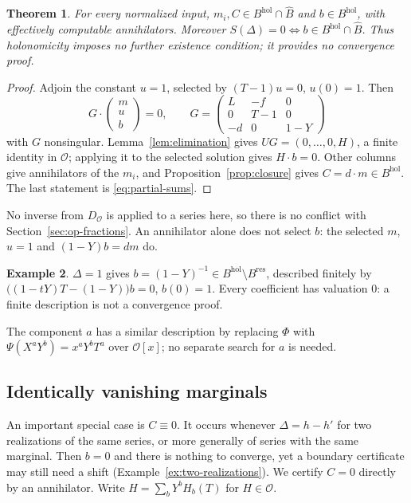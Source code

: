 \documentclass[11pt,a4paper]{article}
\newcommand{\Op}{\mathcal O}
\newcommand{\Bhat}{\widehat B}
\newcommand{\Bres}{B^{\mathrm{res}}}
\newcommand{\Bhol}{B^{\mathrm{hol}}}
\newcommand{\Dop}{D_{\Op}}
\theoremstyle{plain}
\newtheorem{theorem}{Theorem}[section]
\theoremstyle{definition}
\newtheorem{example}[theorem]{Example}
\theoremstyle{remark}
\begin{document}
\begin{theorem}\label{thm:holonomic}
For every normalized input, $m_i,C\in\Bhol\cap\Bhat$ and $b\in\Bhol$, with
effectively computable annihilators. Moreover
$S(\Delta)=0\iff b\in\Bhol\cap\Bhat$. Thus holonomicity imposes no further
existence condition; it provides no convergence proof.
\end{theorem}
\begin{proof}
Adjoin the constant $u=1$, selected by $(T-1)u=0$, $u(0)=1$. Then
\[
  G\cdot\begin{pmatrix}m\\u\\b\end{pmatrix}=0,\qquad
  G=\begin{pmatrix}L&-f&0\\0&T-1&0\\-d&0&1-Y\end{pmatrix}
\]
with $G$ nonsingular. Lemma~\ref{lem:elimination} gives $UG=(0,\dots,0,H)$,
a finite identity in $\Op$; applying it to the selected solution gives
$H\cdot b=0$. Other columns give annihilators of the $m_i$, and
Proposition~\ref{prop:closure} gives $C=d\cdot m\in\Bhol$. The last statement
is \eqref{eq:partial-sums}.
\end{proof}

No inverse from $\Dop$ is applied to a series here, so there is no conflict
with Section~\ref{sec:op-fractions}. An annihilator alone does not select $b$:
the selected $m$, $u=1$ and $(1-Y)b=dm$ do.

\begin{example}
$\Delta=1$ gives $b=(1-Y)^{-1}\in\Bhol\setminus\Bres$, described finitely by
$\bigl((1-tY)T-(1-Y)\bigr)b=0$, $b(0)=1$. Every coefficient has valuation $0$:
a finite description is not a convergence proof.
\end{example}

The component $a$ has a similar description by replacing $\Phi$ with
$\Psi(X^aY^b)=x^aY^bT^a$ over $\Op[x]$; no separate search for $a$ is needed.

\subsection{Identically vanishing marginals}\label{sec:zero}
An important special case is $C\equiv0$. It occurs whenever $\Delta=h-h'$ for
two realizations of the same series, or more generally of series with the same
marginal. Then $b=0$ and there is nothing to converge, yet a boundary
certificate may still need a shift (Example~\ref{ex:two-realizations}). We
certify $C=0$ directly by an annihilator. Write $H=\sum_bY^bH_b(T)$ for
$H\in\Op$.
\end{document}
